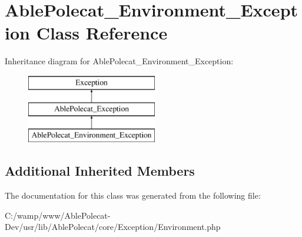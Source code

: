 \hypertarget{class_able_polecat___environment___exception}{}\section{Able\+Polecat\+\_\+\+Environment\+\_\+\+Exception Class Reference}
\label{class_able_polecat___environment___exception}
Inheritance diagram for Able\+Polecat\+\_\+\+Environment\+\_\+\+Exception\+:\begin{figure}[H]
\begin{center}
\leavevmode
\includegraphics[height=3.000000cm]{class_able_polecat___environment___exception}
\end{center}
\end{figure}
\subsection*{Additional Inherited Members}


The documentation for this class was generated from the following file\+:\begin{DoxyCompactItemize}
\item 
C\+:/wamp/www/\+Able\+Polecat-\/\+Dev/usr/lib/\+Able\+Polecat/core/\+Exception/Environment.\+php\end{DoxyCompactItemize}

